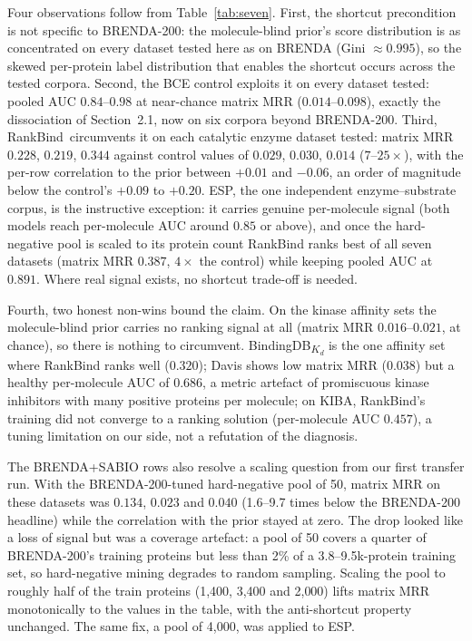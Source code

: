\documentclass[11pt,a4paper]{article}
\newcommand{\method}{RankBind\xspace}
\newcommand{\mrr}{matrix MRR}
\begin{document}
Four observations follow from Table~\ref{tab:seven}. First, the shortcut
precondition is not specific to BRENDA-200: the molecule-blind prior's
score distribution is as concentrated on every dataset tested here as on
BRENDA (Gini $\approx 0.995$), so the skewed per-protein label distribution
that enables the shortcut occurs across the tested corpora. Second, the BCE
control exploits it on every dataset tested: pooled AUC
$0.84$--$0.98$ at near-chance \mrr{} ($0.014$--$0.098$), exactly the
dissociation of Section~2.1, now on six corpora beyond BRENDA-200. Third,
\method\ circumvents it on each catalytic enzyme dataset tested: \mrr{} $0.228$,
$0.219$, $0.344$ against control values of $0.029$, $0.030$, $0.014$
($7$--$25\times$), with the per-row correlation to the prior between
$+0.01$ and $-0.06$, an order of magnitude below the control's $+0.09$
to $+0.20$. ESP, the one independent enzyme--substrate corpus, is the
instructive
exception: it carries genuine per-molecule signal (both models reach
per-molecule AUC around $0.85$ or above), and once the hard-negative pool is scaled to
its protein count \method{} ranks best of all seven datasets (\mrr{} $0.387$,
$4\times$ the control) while keeping pooled AUC at $0.891$. Where real
signal exists, no shortcut trade-off is needed.

Fourth, two honest non-wins bound the claim. On the kinase affinity sets the
molecule-blind prior carries no ranking signal at all (\mrr{} $0.016$--$0.021$,
at chance), so there is nothing to circumvent. BindingDB\textsubscript{$K_d$}
is the one affinity set where \method{} ranks well ($0.320$); Davis shows
low \mrr{} ($0.038$) but a healthy per-molecule AUC of $0.686$, a metric
artefact of promiscuous kinase inhibitors with many positive proteins per
molecule; on KIBA, \method's training did not converge to a ranking
solution (per-molecule AUC $0.457$), a tuning limitation on our side, not a
refutation of the diagnosis.

The BRENDA+SABIO rows also resolve a scaling question from our first
transfer run. With the BRENDA-200-tuned hard-negative pool of 50, \mrr{} on
these datasets was $0.134$, $0.023$ and $0.040$ (1.6--9.7 times
below the BRENDA-200 headline) while the correlation with the prior stayed
at zero. The drop looked like a loss of signal but was a coverage artefact:
a pool of 50 covers a quarter of BRENDA-200's training proteins but less
than 2\% of a 3.8--9.5k-protein training set, so hard-negative mining
degrades to random sampling. Scaling the pool to roughly half of the train
proteins (1{,}400, 3{,}400 and 2{,}000) lifts \mrr{} monotonically to the
values in the table, with the anti-shortcut property unchanged. The same
fix, a pool of 4{,}000, was applied to ESP.
\end{document}
